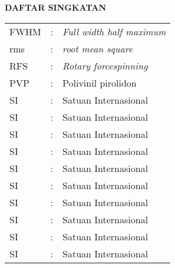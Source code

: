 \clearpage
{}
{}

\begin{center}
    \large \textbf{DAFTAR SINGKATAN}
\end{center}
\vspace{3em}

\begin{center}
    \begin{table}[htbp]
        \begin{tabular}{l l l}
            FWHM            &:& \textit{Full width half maximum} \\ %
            rms             &:& \textit{root mean square}        \\ %
            RFS             &:& \textit{Rotary forcespinning}    \\ %
            PVP             &:& Polivinil pirolidon              \\ %
            SI              &:& Satuan Internasional             \\ %
            SI              &:& Satuan Internasional             \\ %
            SI              &:& Satuan Internasional             \\ %
            SI              &:& Satuan Internasional             \\ %
            SI              &:& Satuan Internasional             \\ %
            SI              &:& Satuan Internasional             \\ %
            SI              &:& Satuan Internasional             \\ %
            SI              &:& Satuan Internasional             \\ %
            SI              &:& Satuan Internasional             \\ %
            SI              &:& Satuan Internasional             \\
        \end{tabular}
    \end{table}
\end{center}


